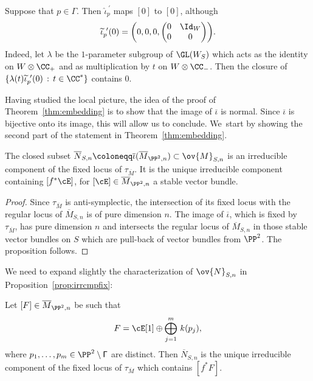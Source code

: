 \begin{rema}\label{rmk:0Case2}
Suppose that $p\in\Gamma$.
Then
$\widehat{\iota}_p^{\ \prime}$ maps $[0]$ to $[0]$, although
\[
\widetilde{\iota}_p^{\ \prime}(0)=\biggl(0,0,0,\begin{pmatrix}0&\Id_W\\ 0&0\end{pmatrix}\biggr).
\]
Indeed, let $\lambda$ be the $1$-parameter subgroup of $\GL(W_S)$ which acts as the identity on $W\otimes\CC_{+}$ and as multiplication by $t$ on $W\otimes\CC_{-}$.
Then the closure of $\{\lambda(t)\widetilde{\iota}_p^{\ \prime}(0) \,:\, t\in \CC^{*}\}$ contains $0$.
\end{rema}

Having studied the local picture, the idea of the proof of Theorem~\ref{thm:embedding} is to show that the image of $\overline{\iota}$ is normal. Since $\overline{\iota}$ is bijective onto its image, this will allow us to conclude. We~start by showing the second part of the statement in Theorem~\ref{thm:embedding}.

\begin{prop}\label{prop:irrcmpfix}
The closed subset $\overline{N}_{S,n}\coloneqq\overline{\iota}(\overline{M}_{\PP^2,n})\subset\ov{M}_{S,n}$ is an irreducible component of the fixed locus of $\tau_{\overline{M}}$.
It is the unique irreducible component containing $[f^*\cE]$, for $[\cE]\in\overline{M}_{\PP^2,n}$ a stable vector bundle.
\end{prop}

\begin{proof}
Since $\tau_{\overline{M}}$ is anti-symplectic, the intersection of its fixed locus with the regular locus of $\overline{M}_{S,n}$ is of pure dimension $n$.
The image of $\overline{\iota}$, which is fixed by~$\tau_{\overline{M}}$, has pure dimension $n$ and intersects the regular locus of $\overline{M}_{S,n}$ in those stable vector bundles on $S$ which are pull-back of vector bundles from $\PP^2$.
The proposition follows.
\end{proof}

We need to expand slightly the characterization of $\ov{N}_{S,n}$ in Proposition~\ref{prop:irrcmpfix}:

\begin{lemm}\label{lem:UniqueFixedComponent}
Let $[F]\in\overline{M}_{\PP^2,n}$ be such that\vspace*{-3pt}
\[
F=\cE[1]\oplus \bigoplus_{j=1}^m\, k(p_j),
\]
where $p_1,\dots,p_m\in \PP^2\setminus\mathsf{\Gamma}$
are distinct. Then $\overline{N}_{S,n}$ is the unique irreducible component of the fixed locus of $\tau_{\overline{M}}$ which contains $[f^*F]$.
\end{lemm}

